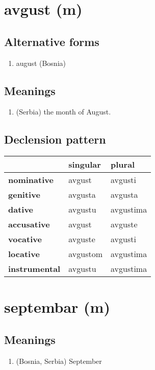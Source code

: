 \filbreak
\section{avgust (m)}
\subsection*{Alternative forms}
\begin{enumerate}
\item august (Bosnia)
\end{enumerate}
\subsection*{Meanings}
\begin{enumerate}
\item (Serbia) the month of August.
\end{enumerate}
\subsection*{Declension pattern}
\begin{tabularx}{\linewidth}{Xll}
\toprule
{} &  singular &     plural \\
\midrule
\textbf{nominative  } &    avgust &    avgusti \\
\textbf{genitive    } &   avgusta &    avgusta \\
\textbf{dative      } &   avgustu &  avgustima \\
\textbf{accusative  } &    avgust &    avguste \\
\textbf{vocative    } &   avguste &    avgusti \\
\textbf{locative    } &  avgustom &  avgustima \\
\textbf{instrumental} &   avgustu &  avgustima \\
\bottomrule
\end{tabularx}

\filbreak
\section{septembar (m)}
\subsection*{Meanings}
\begin{enumerate}
\item (Bosnia, Serbia) September
\end{enumerate}
